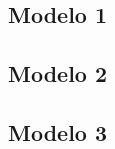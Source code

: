 \subsection{Modelo 1}

\lipsum[1]

\subsection{Modelo 2}

\lipsum[1]

\subsection{Modelo 3}

\lipsum[1]